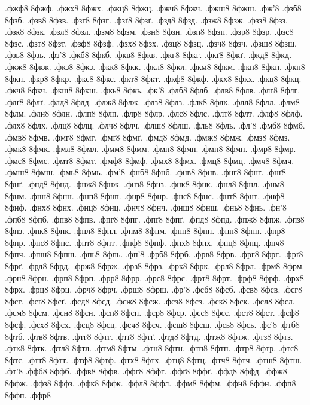 {.фжф8
8фжф.
.фжх8
8фжх.
.фжц8
8фжц.
.фжч8
8фжч.
.фжш8
8фжш.
.фж'8
.фзб8
8фзб.
.фзв8
8фзв.
.фзг8
8фзг.
.фзґ8
8фзґ.
.фзд8
8фзд.
.фзж8
8фзж.
.фзз8
8фзз.
.фзк8
8фзк.
.фзл8
8фзл.
.фзм8
8фзм.
.фзн8
8фзн.
.фзп8
8фзп.
.фзр8
8фзр.
.фзс8
8фзс.
.фзт8
8фзт.
.фзф8
8фзф.
.фзх8
8фзх.
.фзц8
8фзц.
.фзч8
8фзч.
.фзш8
8фзш.
.фзь8
8фзь.
.фз'8
.фкб8
8фкб.
.фкв8
8фкв.
.фкг8
8фкг.
.фкґ8
8фкґ.
.фкд8
8фкд.
.фкж8
8фкж.
.фкз8
8фкз.
.фкк8
8фкк.
.фкл8
8фкл.
.фкм8
8фкм.
.фкн8
8фкн.
.фкп8
8фкп.
.фкр8
8фкр.
.фкс8
8фкс.
.фкт8
8фкт.
.фкф8
8фкф.
.фкх8
8фкх.
.фкц8
8фкц.
.фкч8
8фкч.
.фкш8
8фкш.
.фкь8
8фкь.
.фк'8
.флб8
8флб.
.флв8
8флв.
.флг8
8флг.
.флґ8
8флґ.
.флд8
8флд.
.флж8
8флж.
.флз8
8флз.
.флк8
8флк.
.флл8
8флл.
.флм8
8флм.
.флн8
8флн.
.флп8
8флп.
.флр8
8флр.
.флс8
8флс.
.флт8
8флт.
.флф8
8флф.
.флх8
8флх.
.флц8
8флц.
.флч8
8флч.
.флш8
8флш.
.фль8
8фль.
.фл'8
.фмб8
8фмб.
.фмв8
8фмв.
.фмг8
8фмг.
.фмґ8
8фмґ.
.фмд8
8фмд.
.фмж8
8фмж.
.фмз8
8фмз.
.фмк8
8фмк.
.фмл8
8фмл.
.фмм8
8фмм.
.фмн8
8фмн.
.фмп8
8фмп.
.фмр8
8фмр.
.фмс8
8фмс.
.фмт8
8фмт.
.фмф8
8фмф.
.фмх8
8фмх.
.фмц8
8фмц.
.фмч8
8фмч.
.фмш8
8фмш.
.фмь8
8фмь.
.фм'8
.фнб8
8фнб.
.фнв8
8фнв.
.фнг8
8фнг.
.фнґ8
8фнґ.
.фнд8
8фнд.
.фнж8
8фнж.
.фнз8
8фнз.
.фнк8
8фнк.
.фнл8
8фнл.
.фнм8
8фнм.
.фнн8
8фнн.
.фнп8
8фнп.
.фнр8
8фнр.
.фнс8
8фнс.
.фнт8
8фнт.
.фнф8
8фнф.
.фнх8
8фнх.
.фнц8
8фнц.
.фнч8
8фнч.
.фнш8
8фнш.
.фнь8
8фнь.
.фн'8
.фпб8
8фпб.
.фпв8
8фпв.
.фпг8
8фпг.
.фпґ8
8фпґ.
.фпд8
8фпд.
.фпж8
8фпж.
.фпз8
8фпз.
.фпк8
8фпк.
.фпл8
8фпл.
.фпм8
8фпм.
.фпн8
8фпн.
.фпп8
8фпп.
.фпр8
8фпр.
.фпс8
8фпс.
.фпт8
8фпт.
.фпф8
8фпф.
.фпх8
8фпх.
.фпц8
8фпц.
.фпч8
8фпч.
.фпш8
8фпш.
.фпь8
8фпь.
.фп'8
.фрб8
8фрб.
.фрв8
8фрв.
.фрг8
8фрг.
.фрґ8
8фрґ.
.фрд8
8фрд.
.фрж8
8фрж.
.фрз8
8фрз.
.фрк8
8фрк.
.фрл8
8фрл.
.фрм8
8фрм.
.фрн8
8фрн.
.фрп8
8фрп.
.фрр8
8фрр.
.фрс8
8фрс.
.фрт8
8фрт.
.фрф8
8фрф.
.фрх8
8фрх.
.фрц8
8фрц.
.фрч8
8фрч.
.фрш8
8фрш.
.фр'8
.фсб8
8фсб.
.фсв8
8фсв.
.фсг8
8фсг.
.фсґ8
8фсґ.
.фсд8
8фсд.
.фсж8
8фсж.
.фсз8
8фсз.
.фск8
8фск.
.фсл8
8фсл.
.фсм8
8фсм.
.фсн8
8фсн.
.фсп8
8фсп.
.фср8
8фср.
.фсс8
8фсс.
.фст8
8фст.
.фсф8
8фсф.
.фсх8
8фсх.
.фсц8
8фсц.
.фсч8
8фсч.
.фсш8
8фсш.
.фсь8
8фсь.
.фс'8
.фтб8
8фтб.
.фтв8
8фтв.
.фтг8
8фтг.
.фтґ8
8фтґ.
.фтд8
8фтд.
.фтж8
8фтж.
.фтз8
8фтз.
.фтк8
8фтк.
.фтл8
8фтл.
.фтм8
8фтм.
.фтн8
8фтн.
.фтп8
8фтп.
.фтр8
8фтр.
.фтс8
8фтс.
.фтт8
8фтт.
.фтф8
8фтф.
.фтх8
8фтх.
.фтц8
8фтц.
.фтч8
8фтч.
.фтш8
8фтш.
.фт'8
.ффб8
8ффб.
.ффв8
8ффв.
.ффг8
8ффг.
.ффґ8
8ффґ.
.ффд8
8ффд.
.ффж8
8ффж.
.ффз8
8ффз.
.ффк8
8ффк.
.ффл8
8ффл.
.ффм8
8ффм.
.ффн8
8ффн.
.ффп8
8ффп.
.ффр8
}
